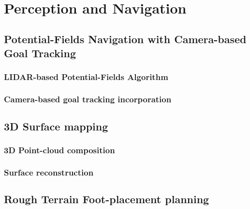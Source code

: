 \chapter{Perception and Navigation}
\label{ch::navigation}


	\section{Potential-Fields Navigation with Camera-based Goal Tracking}

		\subsection{LIDAR-based Potential-Fields Algorithm}


		\subsection{Camera-based goal tracking incorporation}




	\section{3D Surface mapping}


		\subsection{3D Point-cloud composition}


		\subsection{Surface reconstruction}



	\section{Rough Terrain Foot-placement planning}


